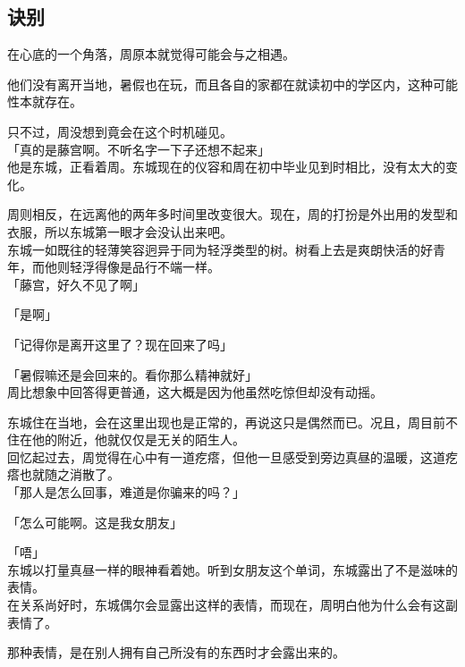 \subsection{诀别}

在心底的一个角落，周原本就觉得可能会与之相遇。

他们没有离开当地，暑假也在玩，而且各自的家都在就读初中的学区内，这种可能性本就存在。

只不过，周没想到竟会在这个时机碰见。\\

「真的是藤宫啊。不听名字一下子还想不起来」\\

他是东城，正看着周。东城现在的仪容和周在初中毕业见到时相比，没有太大的变化。

周则相反，在远离他的两年多时间里改变很大。现在，周的打扮是外出用的发型和衣服，所以东城第一眼才会没认出来吧。\\

东城一如既往的轻薄笑容迥异于同为轻浮类型的树。树看上去是爽朗快活的好青年，而他则轻浮得像是品行不端一样。\\

「藤宫，好久不见了啊」

「是啊」

「记得你是离开这里了？现在回来了吗」

「暑假嘛还是会回来的。看你那么精神就好」\\

周比想象中回答得更普通，这大概是因为他虽然吃惊但却没有动摇。

东城住在当地，会在这里出现也是正常的，再说这只是偶然而已。况且，周目前不住在他的附近，他就仅仅是无关的陌生人。\\

回忆起过去，周觉得在心中有一道疙瘩，但他一旦感受到旁边真昼的温暖，这道疙瘩也就随之消散了。\\

「那人是怎么回事，难道是你骗来的吗？」

「怎么可能啊。这是我女朋友」

「唔」\\

东城以打量真昼一样的眼神看着她。听到女朋友这个单词，东城露出了不是滋味的表情。\\

在关系尚好时，东城偶尔会显露出这样的表情，而现在，周明白他为什么会有这副表情了。

那种表情，是在别人拥有自己所没有的东西时才会露出来的。\\

